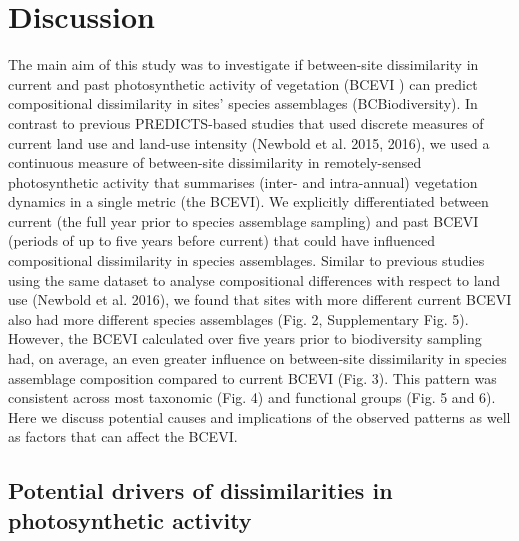 \section{Discussion}
The main aim of this study was to investigate if between-site dissimilarity in current and past photosynthetic activity of vegetation (BCEVI ) can predict compositional dissimilarity in sites’ species assemblages (BCBiodiversity). In contrast to previous PREDICTS-based studies that used discrete measures of current land use and land-use intensity (Newbold et al. 2015, 2016), we used a continuous measure of between-site dissimilarity in remotely-sensed photosynthetic activity that summarises (inter- and intra-annual)  vegetation dynamics in a single metric (the BCEVI). We explicitly differentiated between current (the full year prior to species assemblage sampling) and past BCEVI (periods of up to five years before current) that could have influenced compositional dissimilarity in species assemblages. Similar to previous studies using the same dataset to analyse compositional differences with respect to land use (Newbold et al. 2016), we found that sites with more different current BCEVI also had more different species assemblages (Fig. 2, Supplementary Fig. 5). However, the BCEVI calculated over five years prior to biodiversity sampling had, on average, an even greater influence on between-site dissimilarity in species assemblage composition compared to current BCEVI (Fig. 3). This pattern was consistent across most taxonomic (Fig. 4) and functional groups (Fig. 5 and 6). Here we discuss potential causes and implications of the observed patterns as well as factors that can affect the BCEVI.

\subsection{Potential drivers of dissimilarities in photosynthetic activity }


\clearpage
%

%  
